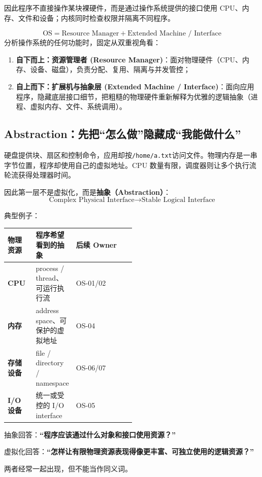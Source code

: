 \documentclass[11pt,a4paper]{ctexart}
\newcommand{\kw}[1]{\textbf{#1}}
\newcommand{\code}[1]{\texttt{#1}}
\begin{document}
因此程序不直接操作某块裸硬件，而是通过操作系统提供的接口使用 CPU、内存、文件和设备；内核同时检查权限并隔离不同程序。

\begin{corebox}
\[
\boxed{
\text{OS} = \text{Resource Manager} + \text{Extended Machine / Interface}
}
\]
分析操作系统的任何功能时，固定从双重视角看：
\begin{enumerate}
  \item \kw{自下而上：资源管理者 (Resource Manager)}：面对物理硬件（CPU、内存、设备、磁盘），负责分配、复用、隔离与并发管控；
  \item \kw{自上而下：扩展机与抽象层 (Extended Machine / Interface)}：面向应用程序，隐藏底层接口细节，把粗糙的物理硬件重新解释为优雅的逻辑抽象（进程、虚拟内存、文件、系统调用）。
\end{enumerate}
\end{corebox}

\subsection{Abstraction：先把“怎么做”隐藏成“我能做什么”}

硬盘提供块、扇区和控制命令，应用却按\code{/home/a.txt}访问文件。物理内存是一串字节位置，程序却使用自己的虚拟地址。CPU 数量有限，调度器则让多个执行流轮流获得处理器时间。

因此第一层不是虚拟化，而是\kw{抽象（Abstraction）}：
\[
\boxed{\text{Complex Physical Interface}\rightarrow\text{Stable Logical Interface}}
\]

典型例子：
\begin{center}
\small
\renewcommand{\arraystretch}{1.25}
\begin{tabularx}{0.92\linewidth}{>{\bfseries}p{0.22\linewidth} p{0.28\linewidth} X}
\toprule
物理资源 & 程序希望看到的抽象 & 后续 Owner\\
\midrule
CPU & process / thread、可运行执行流 & OS-01/02\\
内存 & address space、可保护的虚拟地址 & OS-04\\
存储设备 & file / directory / namespace & OS-06/07\\
I/O 设备 & 统一或受控的 I/O interface & OS-05\\
\bottomrule
\end{tabularx}
\end{center}

\begin{warn}
抽象回答：\kw{“程序应该通过什么对象和接口使用资源？”}

虚拟化回答：\kw{“怎样让有限物理资源表现得像更丰富、可独立使用的逻辑资源？”}

两者经常一起出现，但不能当作同义词。
\end{warn}
\end{document}

